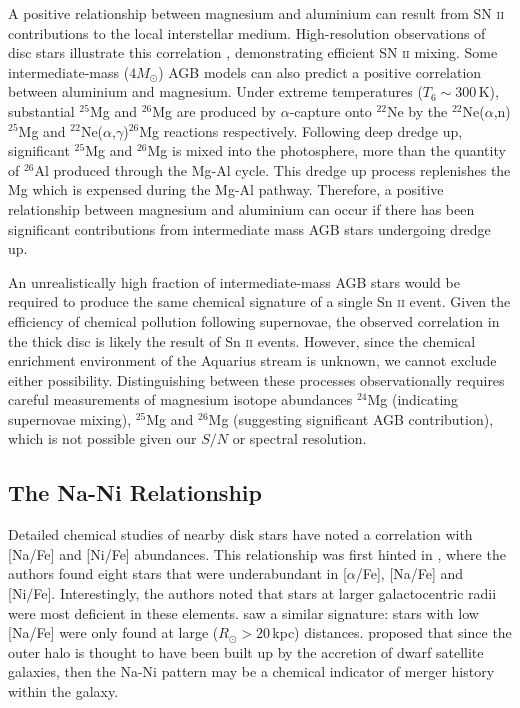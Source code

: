 \documentclass{emulateapj}
\begin{document}
A positive relationship between magnesium and aluminium can result from SN \textsc{ii} contributions to the local interstellar medium. High-resolution observations of disc stars illustrate this correlation \citep{bensby;venn}, demonstrating efficient SN \textsc{ii} mixing. Some intermediate-mass ($4M_\odot$) AGB models can also predict a positive correlation between aluminium and magnesium. Under extreme temperatures ($T_6 \sim 300$\,K), substantial $^{25}$Mg and $^{26}$Mg are produced by $\alpha$-capture onto $^{22}$Ne by the $^{22}$Ne($\alpha$,n)$^{25}$Mg and $^{22}$Ne($\alpha$,$\gamma$)$^{26}$Mg reactions respectively. Following deep dredge up, significant $^{25}$Mg and $^{26}$Mg is mixed into the photosphere, more than the quantity of $^{26}$Al produced through the Mg-Al cycle. This dredge up process replenishes the Mg which is expensed during the Mg-Al pathway. Therefore, a positive relationship between magnesium and aluminium can occur if there has been significant contributions from intermediate mass AGB stars undergoing dredge up. 



An unrealistically high fraction of intermediate-mass AGB stars would be required to produce the same chemical signature of a single Sn \textsc{ii} event. Given the efficiency of chemical pollution following supernovae, the observed correlation in the thick disc is likely the result of Sn \textsc{ii} events. However, since the chemical enrichment environment of the Aquarius stream is unknown, we cannot exclude either possibility. Distinguishing between these processes observationally requires careful measurements of magnesium isotope abundances $^{24}$Mg (indicating supernovae mixing), $^{25}$Mg and $^{26}$Mg (suggesting significant AGB contribution), which is not possible given our $S/N$ or spectral resolution.

\subsection{The Na-Ni Relationship}

Detailed chemical studies of nearby disk stars have noted a correlation with [Na/Fe] and [Ni/Fe] abundances. This relationship was first hinted in \citet{nissen;schuster_1997}, where the authors found eight stars that were underabundant in [$\alpha$/Fe], [Na/Fe] and [Ni/Fe]. Interestingly, the authors noted that stars at larger galactocentric radii were most deficient in these elements. \citet{fulbright_2000} saw a similar signature: stars with low [Na/Fe] were only found at large ($R_\odot > 20$\,kpc) distances. \citet{nissen;schuster_1997} proposed that since the outer halo is thought to have been built up by the accretion of dwarf satellite galaxies, then the Na-Ni pattern may be a chemical indicator of merger history within the galaxy.
\end{document}
